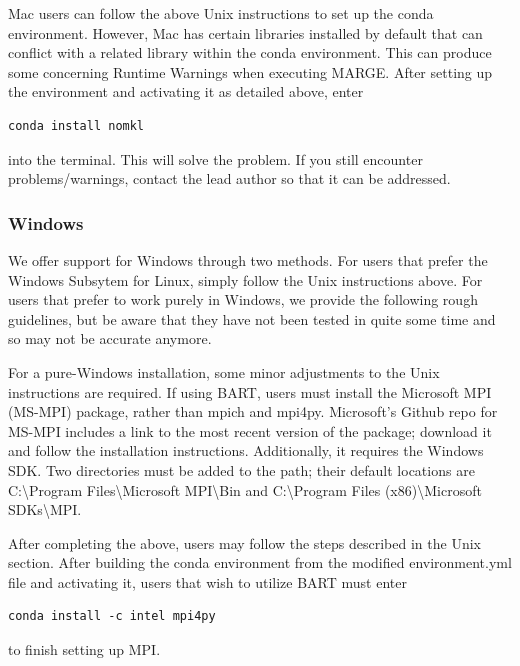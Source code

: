 \documentclass[letterpaper, 12pt]{article}
\begin{document}
\noindent Mac users can follow the above Unix instructions to set up the conda 
environment.  However, Mac has certain libraries installed by default that 
can conflict with a related library within the conda environment.  This can 
produce some concerning Runtime Warnings when executing MARGE.  After setting 
up the environment and activating it as detailed above, enter 
\begin{verbatim}
conda install nomkl
\end{verbatim}
\noindent into the terminal.  This will solve the problem.  
If you still encounter problems/warnings, contact the lead 
author so that it can be addressed.


\subsubsection{Windows}

\noindent We offer support for Windows through two methods.  For users that 
prefer the Windows Subsytem for Linux, simply follow the Unix instructions 
above.  For users that prefer to work purely in Windows, we provide the following 
rough guidelines, but be aware that they have not been tested in quite some time 
and so may not be accurate anymore.\newline

\noindent For a pure-Windows installation, some minor adjustments to the 
Unix instructions are required.  
If using BART, users must install the Microsoft MPI (MS-MPI) package, rather 
than mpich and mpi4py.
Microsoft's Github repo 
for MS-MPI includes a link to the most recent version of the package; download 
it and follow the installation instructions.  Additionally, it requires the 
Windows SDK.  Two directories must be added to the path; their default 
locations are C:{\textbackslash}Program Files{\textbackslash}Microsoft MPI{\textbackslash}Bin and 
C:{\textbackslash}Program Files (x86){\textbackslash}Microsoft SDKs{\textbackslash}MPI. \newline

\noindent After completing the above, users may follow the steps described in the Unix 
section.  After building the conda environment from the modified environment.yml
file and activating it, users that wish to utilize BART must enter
\begin{verbatim}
conda install -c intel mpi4py
\end{verbatim}
\noindent to finish setting up MPI.\newline
\end{document}
